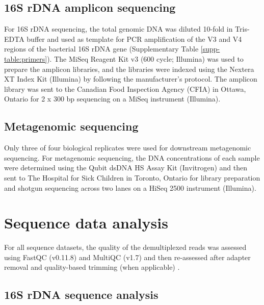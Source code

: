 \subsection{16S rDNA amplicon sequencing}

For 16S rDNA sequencing, the total genomic DNA was diluted 10-fold in Tris-EDTA buffer and used as template for PCR amplification of the V3 and V4 regions of the bacterial 16S rDNA gene (Supplementary Table \ref{supp-table:primers}).
The MiSeq Reagent Kit v3 (600 cycle; Illumina) was used to prepare the amplicon libraries, and the libraries were indexed using the Nextera\textsuperscript{\textregistered{}} XT Index Kit (Illumina) by following the manufacturer’s protocol.
The amplicon library was sent to the Canadian Food Inspection Agency (CFIA) in Ottawa, Ontario for 2 x 300 bp sequencing on a MiSeq instrument (Illumina).

\subsection{Metagenomic sequencing}

Only three of four biological replicates were used for downstream metagenomic sequencing.
For metagenomic sequencing, the DNA concentrations of each sample were determined using the Qubit\textsuperscript{\texttrademark{}} dsDNA HS Assay Kit (Invitrogen) and then sent to The Hospital for Sick Children in Toronto, Ontario for library preparation and shotgun sequencing across two lanes on a HiSeq 2500 instrument (Illumina).

\section{Sequence data analysis}

For all sequence datasets, the quality of the demultiplexed reads was assessed using FastQC (v0.11.8) and MultiQC (v1.7) and then re-assessed after adapter removal and quality-based trimming (when applicable) \parencite{Andrews.2010, Ewels.2016}.

\subsection{16S rDNA sequence analysis}

